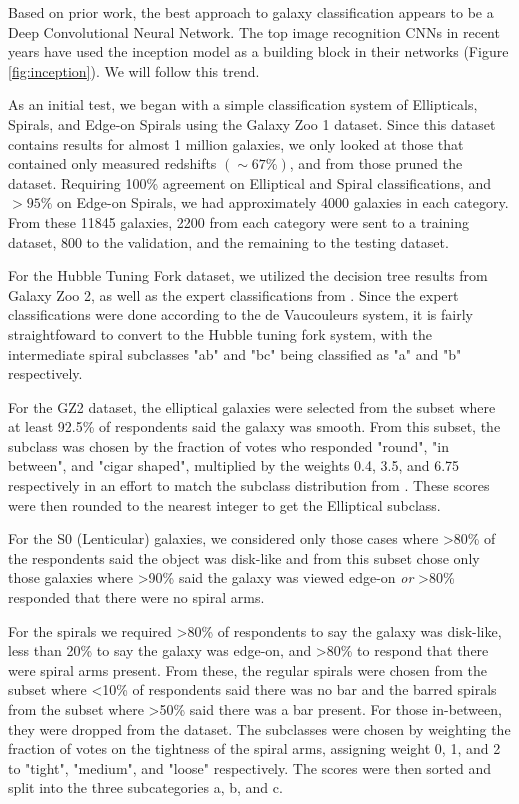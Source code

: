 \documentclass{article}
\begin{document}
Based on prior work, the best approach to galaxy classification appears to be a Deep Convolutional Neural Network. The top image recognition CNNs in recent years have used the inception model \citep{2014arXiv1409.4842S} as a building block in their networks (Figure \ref{fig:inception}). We will follow this trend.

As an initial test, we began with a simple classification system of Ellipticals, Spirals, and Edge-on Spirals using the Galaxy Zoo 1 dataset. Since this dataset contains results for almost 1 million galaxies, we only looked at those that contained only measured redshifts $(\sim 67\%)$, and from those pruned the dataset. Requiring 100\% agreement on Elliptical and Spiral classifications, and $>95\%$ on Edge-on Spirals, we had approximately 4000 galaxies in each category. From these 11845 galaxies, 2200 from each category were sent to a training dataset, 800 to the validation, and the remaining to the testing dataset.

For the Hubble Tuning Fork dataset, we utilized the decision tree results from Galaxy Zoo 2, as well as the expert classifications from \cite{2010ApJS..186..427N}. Since the expert classifications were done according to the de Vaucouleurs system, it is fairly straightfoward to convert to the Hubble tuning fork system, with the intermediate spiral subclasses "ab" and "bc" being classified as "a" and "b" respectively. 

For the GZ2 dataset, the elliptical galaxies were selected from the subset where at least 92.5\% of respondents said the galaxy was smooth. From this subset, the subclass was chosen by the fraction of votes who responded "round", "in between", and "cigar shaped", multiplied by the weights 0.4, 3.5, and 6.75 respectively in an effort to match the subclass distribution from \cite{2010ApJS..186..427N}. These scores were then rounded to the nearest integer to get the Elliptical subclass.

For the S0 (Lenticular) galaxies, we considered only those cases where >80\% of the respondents said the object was disk-like and from this subset chose only those galaxies where >90\% said the galaxy was viewed edge-on \emph{or} >80\% responded that there were no spiral arms.

For the spirals we required >80\% of respondents to say the galaxy was disk-like, less than 20\% to say the galaxy was edge-on, and >80\% to respond that there were spiral arms present. From these, the regular spirals were chosen from the subset where <10\% of respondents said there was no bar and the barred spirals from the subset where >50\% said there was a bar present. For those in-between, they were dropped from the dataset. The subclasses were chosen by weighting the fraction of votes on the tightness of the spiral arms, assigning weight 0, 1, and 2 to "tight", "medium", and "loose" respectively. The scores were then sorted and split into the three subcategories a, b, and c.
\end{document}
